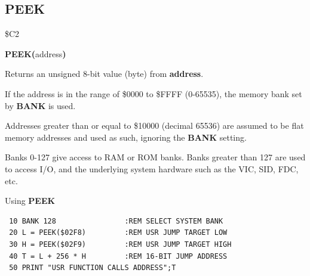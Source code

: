 
\newpage
\subsection{PEEK}
\begin{description}[leftmargin=2cm,style=nextline]
\item [Token:] \$C2
\item [Format:] {\bf PEEK(}address{\bf)}
\item [Usage:]  Returns an unsigned 8-bit value (byte)
                from {\bf address}.

                If the address is in the range of \$0000 to \$FFFF (0-65535), the
                memory bank set by {\bf BANK} is used.

                Addresses greater than or equal to \$10000 (decimal 65536) are assumed to be flat memory
                addresses and used as such, ignoring the {\bf BANK} setting.

\item [Remarks:] Banks 0-127 give access to RAM or ROM banks.
                 Banks greater than 127 are used to access I/O, and the underlying system hardware such as the
                 VIC, SID, FDC, etc.
\item [Example:] Using {\bf PEEK}

\begin{tcolorbox}[colback=black,coltext=white]
\verbatimfont{\codefont}
\begin{verbatim}
 10 BANK 128                :REM SELECT SYSTEM BANK
 20 L = PEEK($02F8)         :REM USR JUMP TARGET LOW
 30 H = PEEK($02F9)         :REM USR JUMP TARGET HIGH
 40 T = L + 256 * H         :REM 16-BIT JUMP ADDRESS
 50 PRINT "USR FUNCTION CALLS ADDRESS";T
\end{verbatim}
\end{tcolorbox}
\end{description}


\newpage
